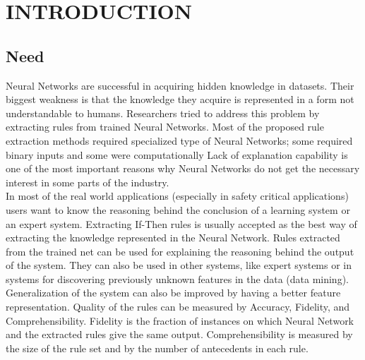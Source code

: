 \documentclass[a4paper,14pt,onecolumn]{article}
\begin{document}
\pagestyle{empty}


\newpage




\newpage
\thispagestyle{empty}
\tableofcontents		%

\newpage
\listoftables


\newpage
\listoffigures

\newpage
{} %
\section{INTRODUCTION}
\subsection{Need}

          Neural Networks are successful in acquiring hidden knowledge in datasets. Their biggest weakness is that the knowledge they acquire is represented in a form not understandable to humans. Researchers tried to address this problem by extracting rules from trained Neural Networks. Most of the proposed rule extraction methods required specialized type of Neural Networks; some required binary inputs and some were computationally Lack of explanation capability is one of the most important reasons why Neural Networks do not get the necessary interest in some parts of the industry.\\
          In most of the real world applications (especially in safety critical applications) users want to know the reasoning behind the conclusion of a learning system or an expert system. Extracting If-Then rules is usually accepted as the best way of extracting the knowledge represented in the Neural Network. Rules extracted from the trained net can be used for explaining the reasoning behind the output of the system. They can also be used in other systems, like expert systems or in systems for discovering previously unknown features in the data (data mining).\\ 
          Generalization of the system can also be improved by having a better feature representation. Quality of the rules can be measured by Accuracy, Fidelity, and Comprehensibility. Fidelity is the fraction of instances on which Neural Network and the extracted rules give the same output. Comprehensibility is measured by the size of the rule set and by the number of antecedents in each rule.
\end{document}
